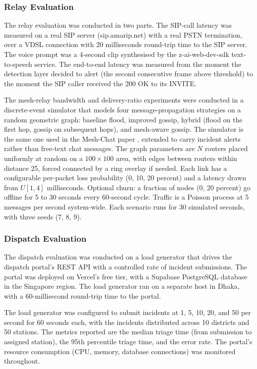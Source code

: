 \subsubsection{Relay Evaluation}

The relay evaluation was conducted in two parts. The SIP-call latency was measured on a real SIP server (sip.amarip.net) with a real PSTN termination, over a VDSL connection with 20 milliseconds round-trip time to the SIP server. The voice prompt was a 4-second clip synthesised by the z-ai-web-dev-sdk text-to-speech service. The end-to-end latency was measured from the moment the detection layer decided to alert (the second consecutive frame above threshold) to the moment the SIP caller received the 200 OK to its INVITE.

The mesh-relay bandwidth and delivery-ratio experiments were conducted in a discrete-event simulator that models four message-propagation strategies on a random geometric graph: baseline flood, improved gossip, hybrid (flood on the first hop, gossip on subsequent hops), and mesh-aware gossip. The simulator is the same one used in the Mesh-Chat paper \cite{meshchat2026}, extended to carry incident alerts rather than free-text chat messages. The graph parameters are $N$ routers placed uniformly at random on a $100 \times 100$ area, with edges between routers within distance 25, forced connected by a ring overlay if needed. Each link has a configurable per-packet loss probability (0, 10, 20 percent) and a latency drawn from $U[1, 4]$ milliseconds. Optional churn: a fraction of nodes (0, 20 percent) go offline for 5 to 30 seconds every 60-second cycle. Traffic is a Poisson process at 5 messages per second system-wide. Each scenario runs for 30 simulated seconds, with three seeds (7, 8, 9).

\subsubsection{Dispatch Evaluation}

The dispatch evaluation was conducted on a load generator that drives the dispatch portal's REST API with a controlled rate of incident submissions. The portal was deployed on Vercel's free tier, with a Supabase PostgreSQL database in the Singapore region. The load generator ran on a separate host in Dhaka, with a 60-millisecond round-trip time to the portal.

The load generator was configured to submit incidents at 1, 5, 10, 20, and 50 per second for 60 seconds each, with the incidents distributed across 10 districts and 50 stations. The metrics reported are the median triage time (from submission to assigned station), the 95th percentile triage time, and the error rate. The portal's resource consumption (CPU, memory, database connections) was monitored throughout.

